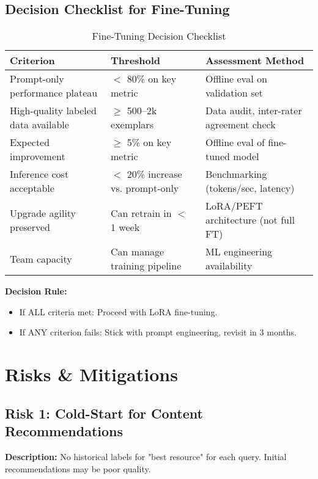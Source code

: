\documentclass[11pt,letterpaper]{article}
\begin{document}
\subsection{Decision Checklist for Fine-Tuning}\label{subsec:decision-checklist}

\begin{table}[H]
\centering
\small
\begin{tabular}{@{}p{5cm}p{3cm}p{6cm}@{}}
\toprule
\textbf{Criterion} & \textbf{Threshold} & \textbf{Assessment Method} \\
\midrule
Prompt-only performance plateau & $<$ 80\% on key metric & Offline eval on validation set \\
High-quality labeled data available & $\geq$ 500--2k exemplars & Data audit, inter-rater agreement check \\
Expected improvement & $\geq$ 5\% on key metric & Offline eval of fine-tuned model \\
Inference cost acceptable & $<$ 20\% increase vs. prompt-only & Benchmarking (tokens/sec, latency) \\
Upgrade agility preserved & Can retrain in $<$ 1 week & LoRA/PEFT architecture (not full FT) \\
Team capacity & Can manage training pipeline & ML engineering availability \\
\bottomrule
\end{tabular}
\caption{Fine-Tuning Decision Checklist}
\end{table}

\textbf{Decision Rule:}
\begin{itemize}
\item If ALL criteria met: Proceed with LoRA fine-tuning.
\item If ANY criterion fails: Stick with prompt engineering, revisit in 3 months.
\end{itemize}

\newpage

\section{Risks \& Mitigations}\label{sec:risks-mitigations}

\subsection{Risk 1: Cold-Start for Content Recommendations}\label{subsec:risk-1-cold-start}

\textbf{Description:} No historical labels for "best resource" for each query. Initial recommendations may be poor quality.
\end{document}
